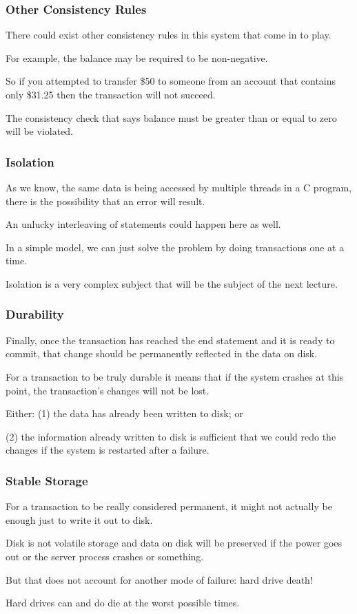 \begin{frame}
\frametitle{Other Consistency Rules}

There could exist other consistency rules in this system that come in to play. 

For example, the balance may be required to be non-negative. 

So if you attempted to transfer \$50 to someone from an account that contains only \$31.25 then the transaction will not succeed.

The consistency check that says balance must be greater than or equal to zero will be violated.

\end{frame}

\begin{frame}
\frametitle{Isolation}

As we know, the same data is being accessed by multiple threads in a C program, there is the possibility that an error will result. 

An unlucky interleaving of statements could happen here as well. 

In a simple model, we can just solve the problem by doing transactions one at a time. 

Isolation is a very complex subject that will be the subject of the next lecture.

\end{frame}

\begin{frame}
\frametitle{Durability}
Finally, once the transaction has reached the end statement and it is ready to commit, that change should be permanently reflected in the data on disk. 

For a transaction to be truly durable it means that if the system crashes at this point, the transaction's changes will not be lost. 

Either: (1) the data has already been written to disk; or 

(2) the information already written to disk is sufficient that we could redo the changes if the system is restarted after a failure.


\end{frame}

\begin{frame}
\frametitle{Stable Storage}

For a transaction to be really considered permanent, it might not actually be enough just to write it out to disk. 

Disk is not volatile storage and data on disk will be preserved if the power goes out or the server process crashes or something. 

But that does not account for another mode of failure: hard drive death! 

Hard drives can and do die at the worst possible times.


\end{frame}


